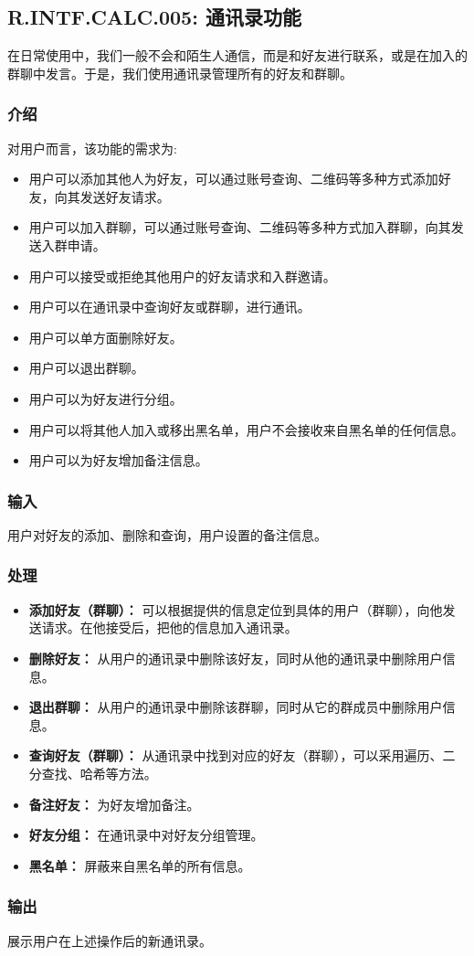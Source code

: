 \subsection{R.INTF.CALC.005: 通讯录功能}
在日常使用中，我们一般不会和陌生人通信，而是和好友进行联系，或是在加入的群聊中发言。于是，我们使用通讯录管理所有的好友和群聊。
\subsubsection{介绍}
对用户而言，该功能的需求为:
\begin{itemize}
  \item 用户可以添加其他人为好友，可以通过账号查询、二维码等多种方式添加好友，向其发送好友请求。
  \item 用户可以加入群聊，可以通过账号查询、二维码等多种方式加入群聊，向其发送入群申请。
  \item 用户可以接受或拒绝其他用户的好友请求和入群邀请。
  \item 用户可以在通讯录中查询好友或群聊，进行通讯。
  \item 用户可以单方面删除好友。
  \item 用户可以退出群聊。
  \item 用户可以为好友进行分组。
  \item 用户可以将其他人加入或移出黑名单，用户不会接收来自黑名单的任何信息。
  \item 用户可以为好友增加备注信息。
\end{itemize}
\subsubsection{输入}
用户对好友的添加、删除和查询，用户设置的备注信息。
\subsubsection{处理}
\begin{itemize}
  \item \textbf{添加好友（群聊）：} 可以根据提供的信息定位到具体的用户（群聊），向他发送请求。在他接受后，把他的信息加入通讯录。
  \item \textbf{删除好友：} 从用户的通讯录中删除该好友，同时从他的通讯录中删除用户信息。
  \item \textbf{退出群聊：} 从用户的通讯录中删除该群聊，同时从它的群成员中删除用户信息。
  \item \textbf{查询好友（群聊）：} 从通讯录中找到对应的好友（群聊），可以采用遍历、二分查找、哈希等方法。
  \item \textbf{备注好友：} 为好友增加备注。
  \item \textbf{好友分组：} 在通讯录中对好友分组管理。
  \item \textbf{黑名单：} 屏蔽来自黑名单的所有信息。
\end{itemize}
\subsubsection{输出}
展示用户在上述操作后的新通讯录。
